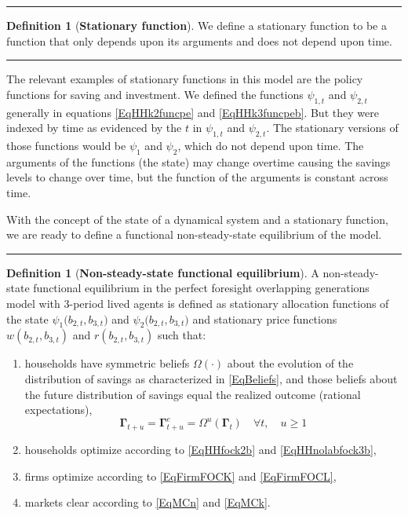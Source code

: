 \documentclass[letterpaper,12pt]{article}
\theoremstyle{definition}
\newtheorem{definition}[theorem]{Definition}
\numberwithin{equation}{section}
\numberwithin{exercise}{section}
\begin{document}
      \vspace{5mm}
      \hrule
      \vspace{-1mm}
      \begin{definition}[\textbf{Stationary function}]\label{DefStatnFunc}
         We define a stationary function to be a function that only depends upon its arguments and does not depend upon time.
      \end{definition}
      \vspace{-2mm}
      \hrule
      \vspace{5mm}
      \begin{spacing}{1.5}

      The relevant examples of stationary functions in this model are the policy functions for saving and investment. We defined the functions $\psi_{1,t}$ and $\psi_{2,t}$ generally in equations \eqref{EqHHk2funcpe} and \eqref{EqHHk3funcpeb}. But they were indexed by time as evidenced by the $t$ in $\psi_{1,t}$ and $\psi_{2,t}$. The stationary versions of those functions would be $\psi_{1}$ and $\psi_2$, which do not depend upon time. The arguments of the functions (the state) may change overtime causing the savings levels to change over time, but the function of the arguments is constant across time.

      With the concept of the state of a dynamical system and a stationary function, we are ready to define a functional non-steady-state equilibrium of the model.

      \end{spacing}
      \vspace{5mm}
      \hrule
      \vspace{-1mm}
      \begin{definition}[\textbf{Non-steady-state functional equilibrium}]\label{Def3perSimpNSSEql}
         A non-steady-state functional equilibrium in the perfect foresight overlapping generations model with $3$-period lived agents is defined as stationary allocation functions of the state $\psi_{1}\bigl(b_{2,t},b_{3,t}\bigr)$ and $\psi_{2}\bigl(b_{2,t},b_{3,t}\bigr)$ and stationary price functions $w(b_{2,t},b_{3,t})$ and $r(b_{2,t},b_{3,t})$ such that:
         \begin{enumerate}
            \item households have symmetric beliefs $\Omega(\cdot)$ about the evolution of the distribution of savings as characterized in \eqref{EqBeliefs}, and those beliefs about the future distribution of savings equal the realized outcome (rational expectations),
               \begin{equation*}
                  \bm{\Gamma}_{t+u} = \bm{\Gamma}^e_{t+u} = \Omega^u\left(\bm{\Gamma}_t\right) \quad\forall t,\quad u\geq 1
               \end{equation*}
            \item households optimize according to \eqref{EqHHfock2b} and \eqref{EqHHnolabfock3b},
            \item firms optimize according to \eqref{EqFirmFOCK} and \eqref{EqFirmFOCL},
            \item markets clear according to \eqref{EqMCn} and \eqref{EqMCk}.
         \end{enumerate}
      \end{definition}
\end{document}
